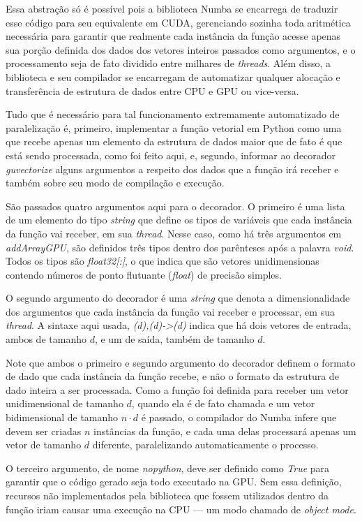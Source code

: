 \documentclass[12pt,
openright, 
oneside, %
a4paper,    %
brazil]{facom-ufu-abntex2}
\begin{document}
Essa abstração só é possível pois a biblioteca Numba se encarrega de traduzir esse código para seu equivalente em CUDA, gerenciando sozinha toda aritmética necessária para garantir que realmente cada instância da função acesse apenas sua porção definida dos dados dos vetores inteiros passados como argumentos, e o processamento seja de fato dividido entre milhares de \textit{threads}. Além disso, a biblioteca e seu compilador se encarregam de automatizar qualquer alocação e transferência de estrutura de dados entre CPU e GPU ou vice-versa.

Tudo que é necessário para tal funcionamento extremamente automatizado de paralelização é, primeiro, implementar a função vetorial em Python como uma que recebe apenas um elemento da estrutura de dados maior que de fato é que está sendo processada, como foi feito aqui, e, segundo, informar ao decorador \textit{guvectorize} alguns argumentos a respeito dos dados que a função irá receber e também sobre seu modo de compilação e execução.

São passados quatro argumentos aqui para o decorador. O primeiro é uma lista de um elemento do tipo \textit{string} que define os tipos de variáveis que cada instância da função vai receber, em sua \textit{thread}. Nesse caso, como há três argumentos em \textit{addArrayGPU}, são definidos três tipos dentro dos parênteses após a palavra \textit{void}. Todos os tipos são \textit{float32[:]}, o que indica que são vetores unidimensionas contendo números de ponto flutuante (\textit{float}) de precisão simples.

O segundo argumento do decorador é uma \textit{string} que denota a dimensionalidade dos argumentos que cada instância da função vai receber e processar, em sua \textit{thread}. A sintaxe aqui usada, \textit{(d),(d)->(d)} indica que há dois vetores de entrada, ambos de tamanho $d$, e um de saída, também de tamanho $d$.

Note que ambos o primeiro e segundo argumento do decorador definem o formato de dado que cada instância da função recebe, e não o formato da estrutura de dado inteira a ser processada. Como a função foi definida para receber um vetor unidimensional de tamanho $d$, quando ela é de fato chamada e um vetor bidimensional de tamanho $n \cdot d$ é passado, o compilador do Numba infere que devem ser criadas $n$ instâncias da função, e cada uma delas processará apenas um vetor de tamanho $d$ diferente, paralelizando automaticamente o processo.

O terceiro argumento, de nome \textit{nopython}, deve ser definido como \textit{True} para garantir que o código gerado seja todo executado na GPU. Sem essa definição, recursos não implementados pela biblioteca que fossem utilizados dentro da função iriam causar uma execução na CPU --- um modo chamado de \textit{object mode}.
\end{document}

